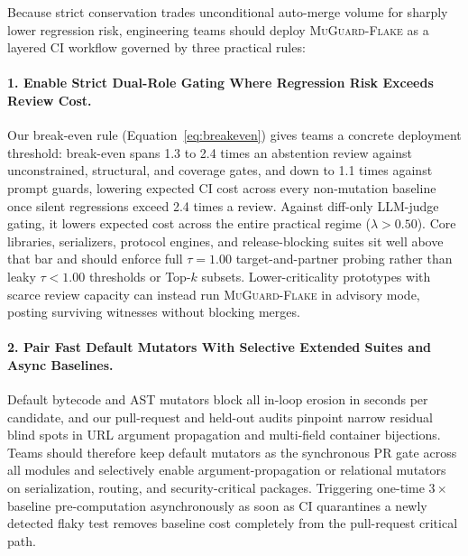 Because strict conservation trades unconditional auto-merge volume for sharply lower regression risk, engineering teams should deploy \textsc{MuGuard-Flake} as a layered CI workflow governed by three practical rules:

\paragraph{1. Enable Strict Dual-Role Gating Where Regression Risk Exceeds Review Cost.}
Our break-even rule (Equation~\ref{eq:breakeven}) gives teams a concrete deployment threshold: break-even spans 1.3 to 2.4 times an abstention review against unconstrained, structural, and coverage gates, and down to 1.1 times against prompt guards, lowering expected CI cost across every non-mutation baseline once silent regressions exceed 2.4 times a review. Against diff-only LLM-judge gating, it lowers expected cost across the entire practical regime ($\lambda > 0.50$). Core libraries, serializers, protocol engines, and release-blocking suites sit well above that bar and should enforce full $\tau = 1.00$ target-and-partner probing rather than leaky $\tau < 1.00$ thresholds or Top-$k$ subsets. Lower-criticality prototypes with scarce review capacity can instead run \textsc{MuGuard-Flake} in advisory mode, posting surviving witnesses without blocking merges.

\paragraph{2. Pair Fast Default Mutators With Selective Extended Suites and Async Baselines.}
Default bytecode and AST mutators block all in-loop erosion in seconds per candidate, and our pull-request and held-out audits pinpoint narrow residual blind spots in URL argument propagation and multi-field container bijections. Teams should therefore keep default mutators as the synchronous PR gate across all modules and selectively enable argument-propagation or relational mutators on serialization, routing, and security-critical packages. Triggering one-time $3\times$ baseline pre-computation asynchronously as soon as CI quarantines a newly detected flaky test removes baseline cost completely from the pull-request critical path.

